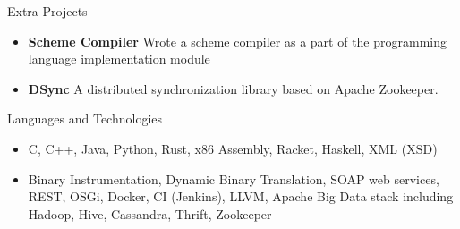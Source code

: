 \documentclass[calibri]{mcdowellcv}
\begin{document}
	\begin{cvsection}{Extra Projects}
		\begin{cvsubsection}{}{}{}
			\begin{itemize}
				\item \textbf{Scheme Compiler} Wrote a scheme compiler as a part of the programming language implementation module
				\item \textbf{DSync}  A distributed synchronization library based on Apache Zookeeper.
			\end{itemize}
		\end{cvsubsection}
	\end{cvsection}
	
	\begin{cvsection}{Languages and Technologies}
		\begin{cvsubsection}{}{}{}	
			\begin{itemize}
				\item C, C++, Java, Python, Rust, x86 Assembly, Racket, Haskell, XML (XSD)
				\item Binary Instrumentation, Dynamic Binary Translation, SOAP web services, REST, OSGi, Docker, CI (Jenkins), LLVM, Apache Big Data stack including Hadoop, Hive, Cassandra, Thrift, Zookeeper
			\end{itemize}
		\end{cvsubsection}
	\end{cvsection}
	
\end{document}
